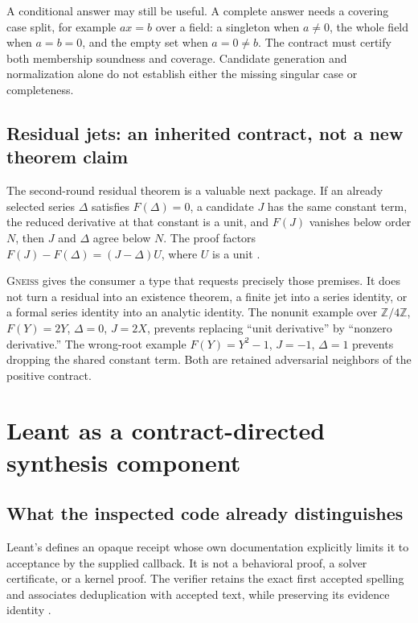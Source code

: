 \documentclass[11pt,letterpaper]{article}
\newcommand{\code}[1]{\texttt{\detokenize{#1}}}
\newcommand{\Gneiss}{\textsc{Gneiss}}
\newcommand{\Z}{\mathbb Z}
\theoremstyle{definition}
\theoremstyle{remark}
\begin{document}
A conditional answer may still be useful. A complete answer needs a covering
case split, for example $ax=b$ over a field: a singleton when $a\ne0$, the whole
field when $a=b=0$, and the empty set when $a=0\ne b$. The contract must certify
both membership soundness and coverage. Candidate generation and normalization
alone do not establish either the missing singular case or completeness.

\subsection{Residual jets: an inherited contract, not a new theorem claim}
The second-round residual theorem is a valuable next package. If an already
selected series $\Delta$ satisfies $F(\Delta)=0$, a candidate $J$ has the same
constant term, the reduced derivative at that constant is a unit, and $F(J)$
vanishes below order $N$, then $J$ and $\Delta$ agree below $N$. The proof
factors $F(J)-F(\Delta)=(J-\Delta)U$, where $U$ is a unit
\cite{syn-a,syn-b}.

\Gneiss{} gives the consumer a type that requests precisely those premises.
It does not turn a residual into an existence theorem, a finite jet into a
series identity, or a formal series identity into an analytic identity. The
nonunit example over $\Z/4\Z$, $F(Y)=2Y$, $\Delta=0$, $J=2X$, prevents replacing
``unit derivative'' by ``nonzero derivative.'' The wrong-root example
$F(Y)=Y^2-1$, $J=-1$, $\Delta=1$ prevents dropping the shared constant term.
Both are retained adversarial neighbors of the positive contract.

\section{Leant as a contract-directed synthesis component}\label{sec:leant}

\subsection{What the inspected code already distinguishes}
Leant's \code{Verification.hs} defines an opaque \code{Verified candidate}
receipt whose own documentation explicitly limits it to acceptance by the
supplied callback. It is not a behavioral proof, a solver certificate, or a
kernel proof. The verifier retains the exact first accepted spelling and
associates deduplication with accepted text, while preserving its evidence
identity \cite{leant-verification}.
\end{document}
